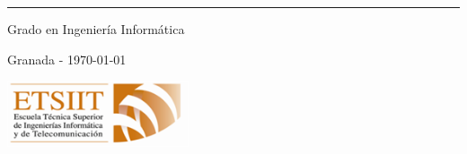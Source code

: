 \begin{titlepage}
\begin{center}
		\rule{139mm}{0.15mm}
		\vspace*{0.1cm}

		\large{Grado en Ingeniería Informática}\\
		\vspace*{0.06in}


		Granada - \today
		
		\vspace*{1.0cm}



		\includegraphics[width=0.4\textwidth]{assets/images/portada/etsiit_logo.png}
	\end{center}
\end{titlepage}